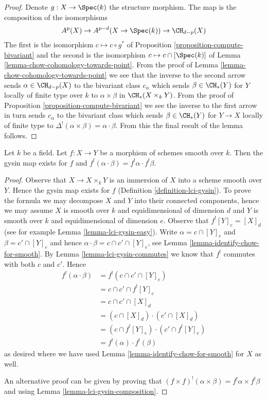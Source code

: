 \begin{proof}
Denote $g : X \to \Spec(k)$ the structure morphism.
The map is the composition of the isomorphisms
$$
A^p(X) \to A^{p - d}(X \to \Spec(k)) \to \CH_{d - p}(X)
$$
The first is the isomorphism $c \mapsto c \circ g^*$ of
Proposition \ref{proposition-compute-bivariant}
and the second is the isomorphism $c \mapsto c \cap [\Spec(k)]$ of
Lemma \ref{lemma-chow-cohomology-towards-point}.
From the proof of Lemma \ref{lemma-chow-cohomology-towards-point}
we see that the inverse to the second arrow sends $\alpha \in \CH_{d - p}(X)$
to the bivariant class $c_\alpha$ which sends $\beta \in \CH_*(Y)$
for $Y$ locally of finite type over $k$
to $\alpha \times \beta$ in $\CH_*(X \times_k Y)$. From the proof of
Proposition \ref{proposition-compute-bivariant} we see the inverse
to the first arrow in turn sends $c_\alpha$ to the bivariant class
which sends $\beta \in \CH_*(Y)$ for $Y \to X$ locally of finite type
to $\Delta^!(\alpha \times \beta) = \alpha \cdot \beta$.
From this the final result of the lemma follows.
\end{proof}

\begin{lemma}
\label{lemma-lci-gysin-product}
Let $k$ be a field. Let $f : X \to Y$ be a morphism of schemes smooth
over $k$. Then the gysin map exists for $f$ and
$f^!(\alpha \cdot \beta) = f^!\alpha \cdot f^!\beta$.
\end{lemma}

\begin{proof}
Observe that $X \to X \times_k Y$ is an immersion of $X$ into a scheme
smooth over $Y$. Hence the gysin map exists for $f$
(Definition \ref{definition-lci-gysin}).
To prove the formula we may decompose $X$ and $Y$ into their
connected components, hence we may assume $X$ is smooth over $k$
and equidimensional of dimension $d$ and $Y$ is smooth over $k$
and equidimensional of dimension $e$. Observe that
$f^![Y]_e = [X]_d$ (see for example Lemma \ref{lemma-lci-gysin-easy}).
Write $\alpha = c \cap [Y]_e$ and $\beta = c' \cap [Y]_e$
and hence $\alpha \cdot \beta = c \cap c' \cap [Y]_e$,
see Lemma \ref{lemma-identify-chow-for-smooth}.
By Lemma \ref{lemma-lci-gysin-commutes} we know that $f^!$
commutes with both $c$ and $c'$. Hence
\begin{align*}
f^!(\alpha \cdot \beta)
& =
f^!(c \cap c' \cap [Y]_e) \\
& =
c \cap c' \cap f^![Y]_e \\
& =
c \cap c' \cap [X]_d \\
& =
(c \cap [X]_d) \cdot (c' \cap [X]_d) \\
& =
(c \cap f^![Y]_e) \cdot (c' \cap f^![Y]_e) \\
& =
f^!(\alpha) \cdot f^!(\beta)
\end{align*}
as desired where we have used Lemma \ref{lemma-identify-chow-for-smooth}
for $X$ as well.

\medskip\noindent
An alternative proof can be given by proving that
$(f \times f)^!(\alpha \times \beta) = f^!\alpha \times f^!\beta$
and using Lemma \ref{lemma-lci-gysin-composition}.
\end{proof}

